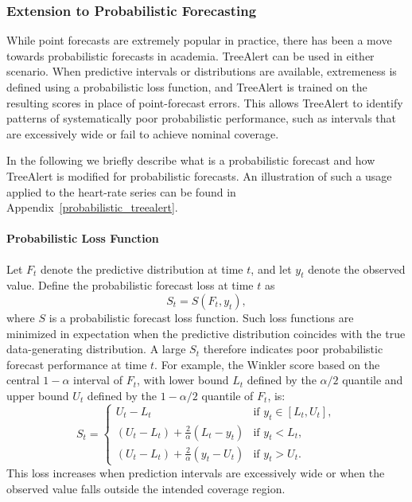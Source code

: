 \documentclass[12pt]{article}
\begin{document}
\subsubsection{Extension to Probabilistic Forecasting}

While point forecasts are extremely popular in practice, there has been a move towards probabilistic forecasts in academia. TreeAlert can be used in either scenario. When predictive intervals or distributions are available, extremeness is defined using a probabilistic loss function, and TreeAlert is trained on the resulting scores in place of point-forecast errors. This allows TreeAlert to identify patterns of systematically poor probabilistic performance, such as intervals that are excessively wide or fail to achieve nominal coverage. 

In the following we briefly describe what is a probabilistic forecast and how TreeAlert is modified for probabilistic forecasts. An illustration of such a usage applied to the heart-rate series can be found in Appendix~\ref{probabilistic_treealert}.

\paragraph{Probabilistic Loss Function}
Let $F_t$ denote the predictive distribution at time $t$, and let $y_t$ denote the observed value.
Define the probabilistic forecast loss at time $t$ as
\begin{equation}
S_t = S(F_t, y_t),
\end{equation}
where $S$ is a probabilistic forecast loss function. Such loss functions are minimized in expectation when the predictive distribution coincides with the true data-generating distribution. A large $S_t$ therefore indicates poor probabilistic forecast performance at time $t$. For example, the Winkler score based on the central $1-\alpha$ interval of $F_t$, with lower bound $L_t$ defined by the $\alpha/2$ quantile and upper bound $U_t$ defined by the $1-\alpha/2$ quantile of $F_t$, is:
\begin{equation}
S_t =
\begin{cases}
U_t - L_t 
& \text{if } y_t \in [L_t, U_t], \\[3pt]
(U_t - L_t) + \frac{2}{\alpha}(L_t - y_t) 
& \text{if } y_t < L_t, \\[3pt]
(U_t - L_t) + \frac{2}{\alpha}(y_t - U_t) 
& \text{if } y_t > U_t.
\end{cases}
\end{equation}
This loss increases when prediction intervals are excessively wide or 
when the observed value falls outside the intended coverage region.
\end{document}

